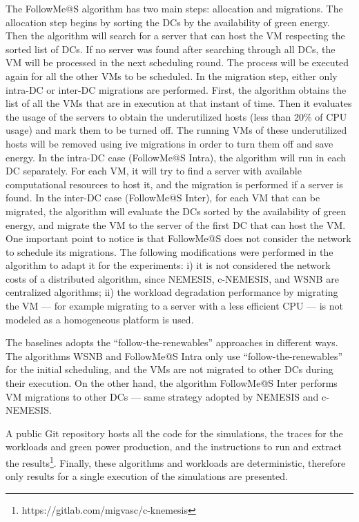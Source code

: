 The FollowMe@S algorithm has two main steps: allocation and migrations. The allocation step begins by sorting the DCs by the availability of green energy. Then the algorithm will search for a server that can host the VM respecting the sorted list of DCs. If no server was found after searching through all DCs, the VM will be processed in the next scheduling round. The process will be executed again for all the other VMs to be scheduled. In the migration step, either only intra-DC or inter-DC migrations are performed. First, the algorithm obtains the list of all the VMs that are in execution at that instant of time. Then it evaluates the usage of the servers to obtain the underutilized hosts (less than 20\% of CPU usage) and mark them to be turned off. The running VMs of these underutilized hosts will be removed using ive migrations in order to turn them off and save energy. In the intra-DC case (FollowMe@S Intra), the algorithm will run in each DC separately. For each VM, it will try to find a server with available computational resources to host it, and the migration is performed if a server is found. In the inter-DC case (FollowMe@S Inter), for each VM that can be migrated, the algorithm will evaluate the DCs sorted by the availability of green energy, and migrate the VM to the server of the first DC that can host the VM. One important point to notice is that FollowMe@S does not consider the network to schedule its migrations. The following modifications were performed in the algorithm to adapt it for the experiments: i) it is not considered the network costs of a distributed algorithm, since NEMESIS, c-NEMESIS, and WSNB are centralized algorithms; ii) the workload degradation performance by migrating the VM --- for example migrating to a server with a less efficient CPU ---  is not modeled as a homogeneous platform is used.

The baselines adopts the ``follow-the-renewables'' approaches in different ways. The algorithms WSNB and FollowMe@S Intra only use ``follow-the-renewables'' for the initial scheduling, and the VMs are not migrated to other DCs during their
execution. On the other hand, the algorithm FollowMe@S Inter performs VM migrations to other DCs --- same strategy adopted by NEMESIS and c-NEMESIS.


A public Git repository hosts all the code for the simulations, the traces for the workloads and green power production, and the instructions to run and extract the results\footnote{https://gitlab.com/migvasc/c-knemesis}.
Finally, these algorithms and workloads are deterministic, therefore only results for a single execution of the simulations are presented.



